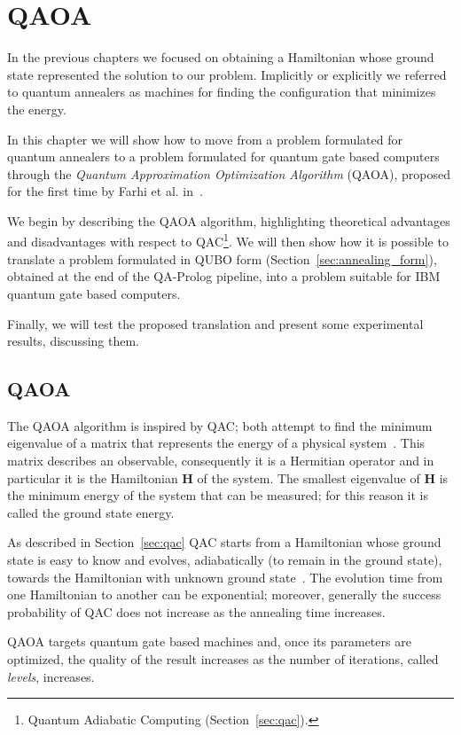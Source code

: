 \chapter{QAOA}
\label{ch:qaoa}
In the previous chapters we focused on obtaining a Hamiltonian whose ground state represented the solution to our problem. Implicitly or explicitly we referred to quantum annealers as machines for finding the configuration that minimizes the energy.

In this chapter we will show how to move from a problem formulated for quantum annealers to a problem formulated for quantum gate based computers through the \emph{Quantum Approximation Optimization Algorithm} (QAOA), proposed for the first time by Farhi et al. in~\cite{farhi2014quantum}.

We begin by describing the QAOA algorithm, highlighting theoretical advantages and disadvantages with respect to QAC\footnote{Quantum Adiabatic Computing (Section~\ref{sec:qac}).}. We will then show how it is possible to translate a problem formulated in QUBO form (Section~\ref{sec:annealing_form}), obtained at the end of the QA-Prolog pipeline, into a problem suitable for IBM quantum gate based computers.

Finally, we will test the proposed translation and present some experimental results, discussing them.
\section{QAOA}
The QAOA algorithm is inspired by QAC; both attempt to find the minimum eigenvalue of a matrix that represents the energy of a physical system~\cite{fakhimi2023quantum}. This matrix describes an observable, consequently it is a Hermitian operator and in particular it is the Hamiltonian $\mathbf{H}$ of the system. The smallest eigenvalue of $\mathbf{H}$ is the minimum energy of the system that can be measured; for this reason it is called the ground state energy.

As described in Section~\ref{sec:qac} QAC starts from a Hamiltonian whose ground state is easy to know and evolves, adiabatically (to remain in the ground state), towards the Hamiltonian with unknown ground state~\cite{fakhimi2023quantum}. The evolution time from one Hamiltonian to another can be exponential\cite{farhi2014quantum}; moreover, generally the success probability of QAC does not increase as the annealing time increases.

QAOA targets quantum gate based machines and, once its parameters are optimized, the quality of the result increases as the number of iterations, called \emph{levels}, increases.

